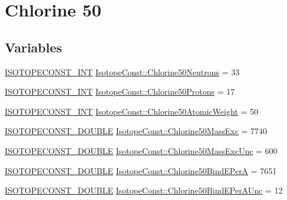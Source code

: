 \hypertarget{group___isotope_const-_chlorine-_cl50}{}\section{Chlorine 50}
\label{group___isotope_const-_chlorine-_cl50}
\subsection*{Variables}
\begin{DoxyCompactItemize}
\item 
\mbox{\hyperlink{group___isotope_const-_macros_ga5f18360b3e99483a35c32d789e62621c}{I\+S\+O\+T\+O\+P\+E\+C\+O\+N\+S\+T\+\_\+\+I\+NT}} \mbox{\hyperlink{group___isotope_const-_chlorine-_cl50_ga199f6c800e159cabc59f306377639cd0}{Isotope\+Const\+::\+Chlorine50\+Neutrons}} = 33
\item 
\mbox{\hyperlink{group___isotope_const-_macros_ga5f18360b3e99483a35c32d789e62621c}{I\+S\+O\+T\+O\+P\+E\+C\+O\+N\+S\+T\+\_\+\+I\+NT}} \mbox{\hyperlink{group___isotope_const-_chlorine-_cl50_ga8c0240d4ddc162a26765b183a109325b}{Isotope\+Const\+::\+Chlorine50\+Protons}} = 17
\item 
\mbox{\hyperlink{group___isotope_const-_macros_ga5f18360b3e99483a35c32d789e62621c}{I\+S\+O\+T\+O\+P\+E\+C\+O\+N\+S\+T\+\_\+\+I\+NT}} \mbox{\hyperlink{group___isotope_const-_chlorine-_cl50_gac2191304070697f3a178d147774a3203}{Isotope\+Const\+::\+Chlorine50\+Atomic\+Weight}} = 50
\item 
\mbox{\hyperlink{group___isotope_const-_macros_ga8f45a7272ce02c0b4c65c44636ed719a}{I\+S\+O\+T\+O\+P\+E\+C\+O\+N\+S\+T\+\_\+\+D\+O\+U\+B\+LE}} \mbox{\hyperlink{group___isotope_const-_chlorine-_cl50_ga268c8992f1d5bc4b052e51447101b520}{Isotope\+Const\+::\+Chlorine50\+Mass\+Exc}} = 7740
\item 
\mbox{\hyperlink{group___isotope_const-_macros_ga8f45a7272ce02c0b4c65c44636ed719a}{I\+S\+O\+T\+O\+P\+E\+C\+O\+N\+S\+T\+\_\+\+D\+O\+U\+B\+LE}} \mbox{\hyperlink{group___isotope_const-_chlorine-_cl50_gad1312eb6484e36707948a70db316cf09}{Isotope\+Const\+::\+Chlorine50\+Mass\+Exc\+Unc}} = 600
\item 
\mbox{\hyperlink{group___isotope_const-_macros_ga8f45a7272ce02c0b4c65c44636ed719a}{I\+S\+O\+T\+O\+P\+E\+C\+O\+N\+S\+T\+\_\+\+D\+O\+U\+B\+LE}} \mbox{\hyperlink{group___isotope_const-_chlorine-_cl50_gafa7f43550796fcf972953619bed22c12}{Isotope\+Const\+::\+Chlorine50\+Bind\+E\+PerA}} = 7651
\item 
\mbox{\hyperlink{group___isotope_const-_macros_ga8f45a7272ce02c0b4c65c44636ed719a}{I\+S\+O\+T\+O\+P\+E\+C\+O\+N\+S\+T\+\_\+\+D\+O\+U\+B\+LE}} \mbox{\hyperlink{group___isotope_const-_chlorine-_cl50_gaafc2ee8193fccecfad32fb1c2527e102}{Isotope\+Const\+::\+Chlorine50\+Bind\+E\+Per\+A\+Unc}} = 12

\end{DoxyCompactItemize}
